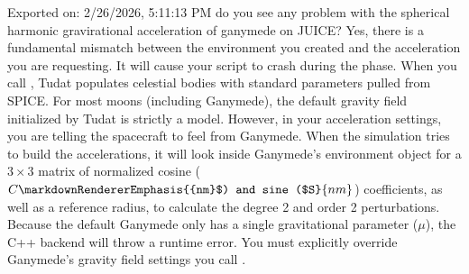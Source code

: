 \markdownRendererDocumentBegin
\markdownRendererSectionBegin
{}\markdownRendererInterblockSeparator
{}\markdownRendererBlockQuoteBegin
Exported on: 2/26/2026, 5:11:13 PM
\markdownRendererBlockQuoteEnd \markdownRendererInterblockSeparator
{}\markdownRendererThematicBreak{}\markdownRendererInterblockSeparator
{}\markdownRendererSectionBegin
{}\markdownRendererInterblockSeparator
{}do you see any problem with the spherical harmonic gravirational acceleration of ganymede on JUICE?\markdownRendererInterblockSeparator
{}
\markdownRendererSectionEnd \markdownRendererSectionBegin
{}\markdownRendererInterblockSeparator
{}Yes, there is a fundamental mismatch between the environment you created and the acceleration you are requesting. It will cause your script to crash during the  phase.\markdownRendererInterblockSeparator
{}\markdownRendererSectionBegin
{}\markdownRendererInterblockSeparator
{}When you call , Tudat populates celestial bodies with standard parameters pulled from SPICE. For most moons (including Ganymede), the default gravity field initialized by Tudat is strictly a  model.\markdownRendererInterblockSeparator
{}However, in your acceleration settings, you are telling the spacecraft to feel  from Ganymede.\markdownRendererInterblockSeparator
{}When the simulation tries to build the accelerations, it will look inside Ganymede's environment object for a $3 \times 3$ matrix of normalized cosine ($C\markdownRendererEmphasis{{nm}$) and sine ($S}{nm}$) coefficients, as well as a reference radius, to calculate the degree 2 and order 2 perturbations. Because the default Ganymede only has a single gravitational parameter ($\mu$), the C++ backend will throw a runtime error.\markdownRendererInterblockSeparator
{}
\markdownRendererSectionEnd \markdownRendererSectionBegin
{}\markdownRendererInterblockSeparator
{}You must explicitly override Ganymede's gravity field settings  you call .\markdownRendererInterblockSeparator

